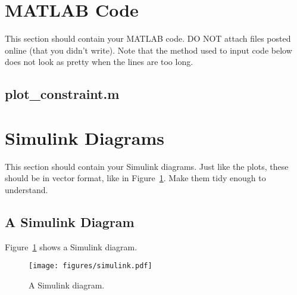 \appendix

\section{MATLAB Code}\label{sec:matlab}
This section should contain your MATLAB code. DO NOT attach files posted online (that you didn't write). Note that the method used to input code below does not look as pretty when the lines are too long.

\subsection{plot\_constraint.m}\label{sec:plot_constraint_m}
\section{Simulink Diagrams}\label{sec:simulink}
This section should contain your Simulink diagrams. Just like the plots, these should be in vector format, like in Figure~\ref{fig:simulink}. Make them tidy enough to understand.

\subsection{A Simulink Diagram}
Figure~\ref{fig:simulink} shows a Simulink diagram.
\begin{figure}[htb]
	\centering
		\texttt{[image: figures/simulink.pdf]}
	\caption{A Simulink diagram.}
\label{fig:simulink}
\end{figure}
